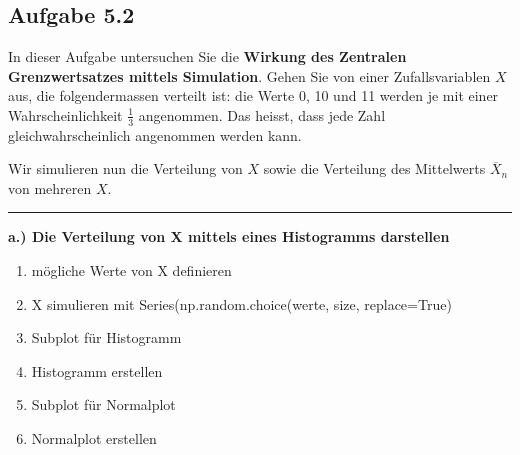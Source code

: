 \documentclass[11pt]{article}
\providecommand{\tightlist}{%
      \setlength{\itemsep}{0pt}\setlength{\parskip}{0pt}}
\begin{document}
    \begin{center}
    \end{center}
    { \hspace*{\fill} \\}
    
    \begin{center}
    \end{center}
    { \hspace*{\fill} \\}
    
    \begin{center}
    \end{center}
    { \hspace*{\fill} \\}
    
    \subsection{Aufgabe 5.2}\label{aufgabe-5.2}

    In dieser Aufgabe untersuchen Sie die \textbf{Wirkung des Zentralen
Grenzwertsatzes mittels Simulation}. Gehen Sie von einer
Zufallsvariablen \(X\) aus, die folgendermassen verteilt ist: die Werte
0, 10 und 11 werden je mit einer Wahrscheinlichkeit \(\frac{1}{3}\)
angenommen. Das heisst, dass jede Zahl gleichwahrscheinlich angenommen
werden kann.

    Wir simulieren nun die Verteilung von \(X\) sowie die Verteilung des
Mittelwerts \(\overline{X}_n\) von mehreren \(X\).

\begin{center}\rule{0.5\linewidth}{\linethickness}\end{center}

\textbf{a.) Die Verteilung von X mittels eines Histogramms darstellen}

\begin{enumerate}
\def\labelenumi{\arabic{enumi}.}
\tightlist
\item
  mögliche Werte von X definieren
\item
  X simulieren mit Series(np.random.choice(werte, size, replace=True)
\item
  Subplot für Histogramm
\item
  Histogramm erstellen
\item
  Subplot für Normalplot
\item
  Normalplot erstellen
\end{enumerate}
\end{document}
